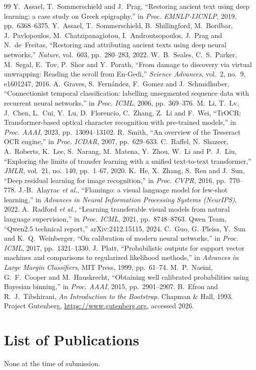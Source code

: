 \documentclass[12pt,a4paper,oneside]{report}
\begin{document}
\begin{thebibliography}{99}
 Y.~Assael, T.~Sommerschield and J.~Prag, ``Restoring ancient text using deep learning: a case study on Greek epigraphy,'' in \emph{Proc. EMNLP-IJCNLP}, 2019, pp.~6368--6375.
 Y.~Assael, T.~Sommerschield, B.~Shillingford, M.~Bordbar, J.~Pavlopoulos, M.~Chatzipanagiotou, I.~Androutsopoulos, J.~Prag and N.~de~Freitas, ``Restoring and attributing ancient texts using deep neural networks,'' \emph{Nature}, vol.~603, pp.~280--283, 2022.
 W.~B.~Seales, C.~S.~Parker, M.~Segal, E.~Tov, P.~Shor and Y.~Porath, ``From damage to discovery via virtual unwrapping: Reading the scroll from En-Gedi,'' \emph{Science Advances}, vol.~2, no.~9, e1601247, 2016.
 A.~Graves, S.~Fern\'andez, F.~Gomez and J.~Schmidhuber, ``Connectionist temporal classification: labelling unsegmented sequence data with recurrent neural networks,'' in \emph{Proc. ICML}, 2006, pp.~369--376.
 M.~Li, T.~Lv, J.~Chen, L.~Cui, Y.~Lu, D.~Florencio, C.~Zhang, Z.~Li and F.~Wei, ``TrOCR: Transformer-based optical character recognition with pre-trained models,'' in \emph{Proc. AAAI}, 2023, pp.~13094--13102.
 R.~Smith, ``An overview of the Tesseract OCR engine,'' in \emph{Proc. ICDAR}, 2007, pp.~629--633.
 C.~Raffel, N.~Shazeer, A.~Roberts, K.~Lee, S.~Narang, M.~Matena, Y.~Zhou, W.~Li and P.~J.~Liu, ``Exploring the limits of transfer learning with a unified text-to-text transformer,'' \emph{JMLR}, vol.~21, no.~140, pp.~1--67, 2020.
 K.~He, X.~Zhang, S.~Ren and J.~Sun, ``Deep residual learning for image recognition,'' in \emph{Proc. CVPR}, 2016, pp.~770--778.
 J.-B.~Alayrac \emph{et al.}, ``Flamingo: a visual language model for few-shot learning,'' in \emph{Advances in Neural Information Processing Systems (NeurIPS)}, 2022.
 A.~Radford \emph{et al.}, ``Learning transferable visual models from natural language supervision,'' in \emph{Proc. ICML}, 2021, pp.~8748--8763.
 Qwen Team, ``Qwen2.5 technical report,'' arXiv:2412.15115, 2024.
 C.~Guo, G.~Pleiss, Y.~Sun and K.~Q.~Weinberger, ``On calibration of modern neural networks,'' in \emph{Proc. ICML}, 2017, pp.~1321--1330.
 J.~Platt, ``Probabilistic outputs for support vector machines and comparisons to regularized likelihood methods,'' in \emph{Advances in Large Margin Classifiers}, MIT Press, 1999, pp.~61--74.
 M.~P.~Naeini, G.~F.~Cooper and M.~Hauskrecht, ``Obtaining well calibrated probabilities using Bayesian binning,'' in \emph{Proc. AAAI}, 2015, pp.~2901--2907.
 B.~Efron and R.~J.~Tibshirani, \emph{An Introduction to the Bootstrap}. Chapman \& Hall, 1993.
 Project Gutenberg, \url{https://www.gutenberg.org}, accessed 2026.
\end{thebibliography}

\chapter*{List of Publications}
None at the time of submission.
\end{document}
